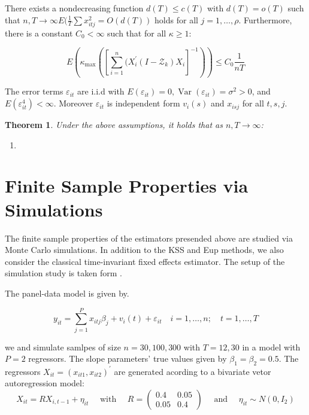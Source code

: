     \begin{assumption}
        There exists a nondecreasing function $d(T) \leq c(T)$ with $d(T) = o(T)$ such that $n, T \to \infty E(\frac{1}{T} \sum x_{itj}^2 = O(d(T))$ holds for all $j = 1, \ldots, \rho$. Furthermore, there is a constant $C_0 < \infty$ such that for all $\kappa \geq 1$:

        $$ E \left( \kappa_{\max} \left( \left[ \sum_{i=1}^n ( X_i ^\prime (I - \mathcal{Z}_k) X_i \right]^{-1} \right) \right) \leq C_0 \frac{1}{nT} $$
    \end{assumption}

    \begin{assumption}
        The error terms $\varepsilon_{it}$ are i.i.d with $E(\varepsilon_{it}) = 0, \operatorname{Var}(\varepsilon_{it}) = \sigma ^2 > 0$, and $E(\varepsilon_{it}^4) < \infty$. Moreover $\varepsilon_{it}$ is independent form $v_i(s)$ and $x_{isj}$ for all $t,s,j$.
    \end{assumption}



\newtheorem{theorem}{Theorem}

\begin{theorem}
Under the above assumptions, it holds that as $n, T \to \infty$:

\begin{enumerate}
    \item 
\end{enumerate}
\end{theorem}
\section{Finite Sample Properties via Simulations}

The finite sample properties of the estimators presended above are studied via Monte Carlo simulations. In addition to the KSS and Eup methods, we also consider the classical time-invariant fixed effects estimator. The setup of the simulation study is taken form \citet{kneip2012new}.

The panel-data model is given by.

\begin{equation}\label{sim_model}
y_{i t}= \sum_{j =1}^P x_{itj} \beta_j + v_i(t)+\varepsilon_{i t} \quad i=1, \ldots, n ; \quad t=1, \ldots, T
\end{equation}

we and simulate samlpes of size $n=30,100,300$ with $T = 12,30$ in a model with $P = 2$ regressors. The slope parameters' true values given by $\beta_1=\beta_2=0.5$. The regressors $X_{it} = (x_{it1}, x_{it2})^\prime$ are generated acording to a bivariate vetor autoregression model:
\begin{equation}\label{sim_x}
X_{i t}=R X_{i, t-1}+\eta_{i t} \quad \text { with } \quad R=\left(\begin{array}{cc}
0.4 & 0.05 \\
0.05 & 0.4
\end{array}\right) \quad \text { and } \quad \eta_{i t} \sim N\left(0, I_2\right)
\end{equation}

